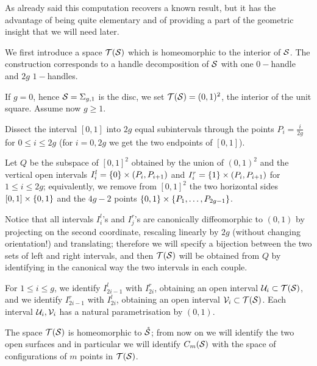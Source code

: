 As already said this computation recovers a known result, but it has the advantage of
being quite elementary and of providing a part of
the geometric insight that we will need later.

We first introduce a space $\T(\S)$ which is homeomorphic to the interior of $\S$. The construction
corresponds to a handle decomposition of $\S$ with one $0-$handle and $2g$ $1-$handles.
\begin{defn}
\label{def:Tsg}
If $g=0$, hence $\S=\sg$ is the disc, we set $\T(\S)=(0,1)^2$, the interior of the unit square. Assume
now $g\geq 1$.

Dissect the interval $[0,1]$ into $2g$ equal subintervals through the points $P_i=\frac{i}{2g}$ for $0\leq i\leq 2g$
(for $i=0,2g$ we get the two endpoints of $[0,1]$).

Let $Q$ be the subspace of $[0,1]^2$ obtained by the union of $(0,1)^2$ and the vertical open intervals
$I_i^l=\set{0}\times (P_i,P_{i+1})$ and $I_i^r=\set{1}\times (P_i,P_{i+1})$ for $1\leq i\leq 2g$;
equivalently, we remove from $[0,1]^2$ the two horizontal sides
$[0,1]\times\set{0,1}$ and the $4g-2$ points $\set{0,1}\times \set{P_1,\dots,P_{2g-1}}$.

Notice that all intervals $I_i^l$'s and $I_j^r$'s are
canonically diffeomorphic
to $(0,1)$ by projecting on the second coordinate, rescaling linearly by $2g$
(without changing orientation!) and translating; therefore we will specify a bijection
between the two sets of left and right intervals, and then $\T(\S)$ will be obtained from $Q$
by identifying in the canonical way the two intervals in each couple.

For $1\leq i\leq g$, we identify $I^l_{2i-1}$ with $I^r_{2i}$, obtaining an open interval $\U_i\subset\T(\S)$,
and we identify $I^r_{2i-1}$ with $I^l_{2i}$, obtaining an open interval $\V_i\subset\T(\S)$.
Each interval $\U_i,\V_i$ has a natural parametrisation by $(0,1)$.
\end{defn}
The space $\T(\S)$ is homeomorphic to $\mrS$; from now
on we will identify the two open surfaces and in particular we will identify $\cms$ with the
space of configurations of $m$ points in $\T(\S)$.

